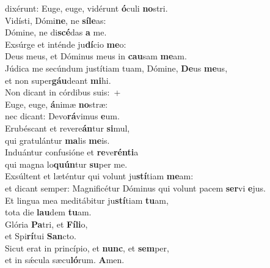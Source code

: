 \evenverse dixérunt: Euge, euge, vidérunt \textbf{ó}culi \textbf{no}stri.\\
\oddverse Vidísti, Dómi\textbf{ne}, ne \textbf{sí}\textbf{le}as:~\*\\
\oddverse Dómine, ne di\textbf{scé}das \textbf{a} me.\\
\evenverse Exsúrge et inténde ju\textbf{dí}cio \textbf{me}o:~\*\\
\evenverse Deus meus, et Dóminus meus in \textbf{cau}sam \textbf{me}am.\\
\oddverse Júdica me secúndum justítiam tuam, Dómine, \textbf{De}us \textbf{me}us,~\*\\
\oddverse et non super\textbf{gáu}deant \textbf{mi}hi.\\
\evenverse Non dicant in córdibus suis:~+\\
\evenverse  Euge, euge, \textbf{á}nimæ \textbf{no}stræ:~\*\\
\evenverse nec dicant: Devo\textbf{rá}vimus \textbf{e}um.\\
\oddverse Erubéscant et revere\textbf{án}tur \textbf{si}mul,~\*\\
\oddverse qui gratulántur \textbf{ma}lis \textbf{me}is.\\
\evenverse Induántur confusióne et \textbf{re}ve\textbf{rén}\textbf{ti}a~\*\\
\evenverse qui magna lo\textbf{quún}tur \textbf{su}per me.\\
\oddverse Exsúltent et læténtur qui volunt ju\textbf{stí}tiam \textbf{me}am:~\*\\
\oddverse et dicant semper: Magnificétur Dóminus qui volunt pacem \textbf{ser}vi \textbf{e}jus.\\
\evenverse Et lingua mea meditábitur ju\textbf{stí}tiam \textbf{tu}am,~\*\\
\evenverse tota die \textbf{lau}dem \textbf{tu}am.\\
\oddverse Glória \textbf{Pa}tri, et \textbf{Fí}\textbf{li}o,~\*\\
\oddverse et Spi\textbf{rí}tui \textbf{San}cto.\\
\evenverse Sicut erat in princípio, et \textbf{nunc}, et \textbf{sem}per,~\*\\
\evenverse et in sǽcula sæcu\textbf{ló}rum. \textbf{A}men.\\
